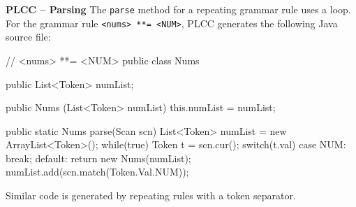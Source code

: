 \begin{minipage}[t]{\sw}
\slidenumber
\LARGE
{\bf PLCC -- Parsing}\exx
The \verb'parse' method for a repeating grammar rule uses a loop.
For the grammar rule \verb'<nums> **= <NUM>',
PLCC generates the following Java source file:
{\large
\begin{qv}
// <nums> **= <NUM>
public class Nums {

    public List<Token> numList;

    public Nums (List<Token> numList) {
        this.numList = numList;
    }

    public static Nums parse(Scan scn) {
        List<Token> numList = new ArrayList<Token>();
        while(true) {
            Token t = scn.cur();
            switch(t.val) {
            case NUM:
                break;
            default:
                return new Nums(numList);
            }
            numList.add(scn.match(Token.Val.NUM));
        }
    }
}
\end{qv}
}
Similar code is generated by repeating rules with a token separator.
\end{minipage}
\clearpage
